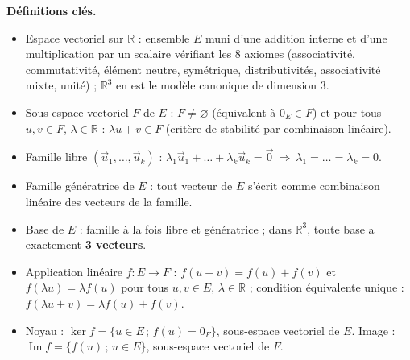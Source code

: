 \documentclass[11pt]{article}
\newcommand{\cle}[1]{{\popxbold\color{popdark}#1}}
\begin{document}
\begin{aretenir}
\textbf{Définitions clés.}
\begin{itemize}
  \item \cle{Espace vectoriel} sur $\mathbb{R}$ : ensemble $E$ muni d'une addition interne et d'une multiplication par un scalaire vérifiant les 8 axiomes (associativité, commutativité, élément neutre, symétrique, distributivités, associativité mixte, unité) ; $\mathbb{R}^3$ en est le modèle canonique de \cle{dimension 3}.
  \item \cle{Sous-espace vectoriel} $F$ de $E$ : $F \neq \varnothing$ (équivalent à $0_E\in F$) et pour tous $u,v\in F$, $\lambda\in\mathbb{R}$ : $\lambda u+v\in F$ (critère de stabilité par combinaison linéaire).
  \item \cle{Famille libre} $(\vec{u}_1,\dots,\vec{u}_k)$ : $\lambda_1\vec{u}_1+\dots+\lambda_k\vec{u}_k=\vec{0}\ \Rightarrow\ \lambda_1=\dots=\lambda_k=0$.
  \item \cle{Famille génératrice} de $E$ : tout vecteur de $E$ s'écrit comme combinaison linéaire des vecteurs de la famille.
  \item \cle{Base} de $E$ : famille à la fois libre et génératrice ; dans $\mathbb{R}^3$, toute base a exactement \textbf{3 vecteurs}.
  \item \cle{Application linéaire} $f:E\to F$ : $f(u+v)=f(u)+f(v)$ et $f(\lambda u)=\lambda f(u)$ pour tous $u,v\in E$, $\lambda\in\mathbb{R}$ ; condition équivalente unique : $f(\lambda u+v)=\lambda f(u)+f(v)$.
  \item \cle{Noyau} : $\ker f=\{u\in E\,;\,f(u)=0_F\}$, sous-espace vectoriel de $E$. \cle{Image} : $\operatorname{Im}f=\{f(u)\,;\,u\in E\}$, sous-espace vectoriel de $F$.
\end{itemize}


\end{aretenir}
\end{document}
